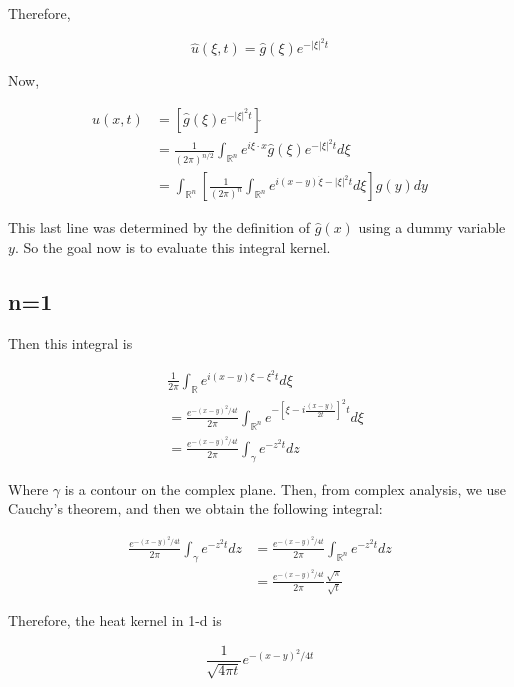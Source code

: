 \documentclass{article}
\newtheorem{one minute paper}[theorem]{One Minute Paper}
\begin{document}
Therefore, 

\begin{equation}
    \hat{u}(\xi,t) = \hat{g}(\xi)e^{-|\xi|^2 t}
\end{equation}

Now, 

\begin{align*}
    u(x,t) &= \left[\hat{g}(\xi)e^{-|\xi|^2 t}\right]\check{} \\
    &= \frac{1}{(2\pi)^{n/2}}\int_{\mathbb{R}^n}e^{i \xi \cdot x}\hat{g}(\xi)e^{-|\xi|^2 t}d\xi\\
    &= \int_{\mathbb{R}^n}\left[ \frac{1}{(2\pi)^n} \int_{\mathbb{R}^n}e^{i(x-y) \dot \xi - |\xi|^2 t}d\xi \right]g(y)dy
\end{align*}

This last line was determined by the definition of $\hat{g}(x)$ using a dummy variable $y$. So the goal now is to evaluate this integral kernel. 

\subsection*{n=1}

Then this integral is  

\begin{align*}
    &\frac{1}{2\pi}\int_{\mathbb{R}}e^{i(x-y)\xi - \xi^2 t}d\xi \\
    &= \frac{e^{-(x-y)^2/4t}}{2\pi}\int_{\mathbb{R}^n}e^{-\left[ \xi - i\frac{(x-y)}{2t} \right]^2t}d\xi\\
    &= \frac{e^{-\left( x-y \right)^2/4t}}{2\pi}\int_{\gamma} e^{-z^2 t}dz
\end{align*}

Where $\gamma$ is a contour on the complex plane. Then, from complex analysis, we use Cauchy's theorem, and then we obtain the following integral:

\begin{align*}
    \frac{e^{-\left( x-y \right)^2/4t}}{2\pi}\int_{\gamma} e^{-z^2 t}dz &= \frac{e^{-\left( x-y \right)^2/4t}}{2\pi}\int_{\mathbb{R}^n} e^{-z^2 t}dz \\
    &= \frac{e^{-\left( x-y \right)^2/4t}}{2\pi}\frac{\sqrt{\pi}}{\sqrt{t}}
\end{align*}

Therefore, the heat kernel in 1-d is 

\begin{equation}
    \frac{1}{\sqrt{4\pi t}}e^{-(x-y)^2/4t}
\end{equation}
\end{document}
